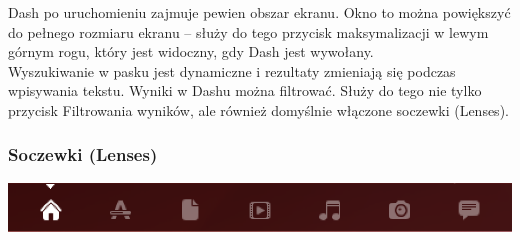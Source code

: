 Dash po uruchomieniu zajmuje pewien obszar ekranu. Okno to można powiększyć do pełnego rozmiaru ekranu – służy do tego przycisk maksymalizacji w lewym górnym rogu, który jest widoczny, gdy Dash jest wywołany.\\
Wyszukiwanie w pasku jest dynamiczne i rezultaty zmieniają się podczas wpisywania tekstu. Wyniki w Dashu można filtrować. Służy do tego nie tylko przycisk Filtrowania wyników, ale również domyślnie włączone soczewki (Lenses).

\subsubsection{Soczewki (Lenses)}
\begin{center}
	\includegraphics[width=\linewidth]{images/unity_dash_lenses.png}
\end{center}

